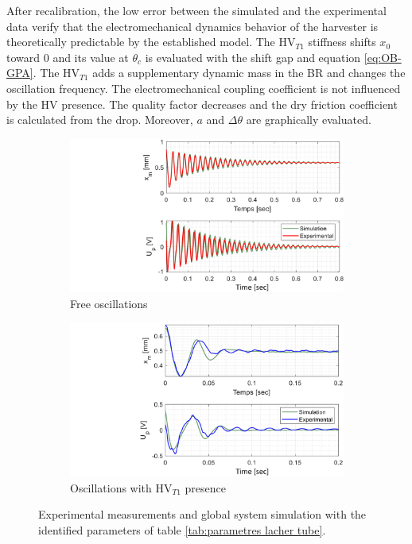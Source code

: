 \documentclass[3p,twocolumn,preprint]{elsarticle}
\begin{document}
After recalibration, the low error between the simulated and the experimental data verify that the electromechanical dynamics behavior of the harvester is theoretically predictable by the established model. The HV$_{T1}$ stiffness shifts $x_0$ toward $0$ and its value at $\theta_c$ is evaluated with the shift gap and equation \ref{eq:OB-GPA}. The HV$_{T1}$ adds a supplementary dynamic mass in the BR and changes the oscillation frequency. The electromechanical coupling coefficient is not influenced by the HV presence. The quality factor decreases and the dry friction coefficient is calculated from the drop. Moreover, $a$ and $\Delta\theta$ are graphically evaluated.
\begin{figure}[!htbp]	
\captionsetup{justification=centering}
	\begin{subfigure}{.49\linewidth}
		\includegraphics[trim={9cm 0cm 0cm 0cm},clip,width=\linewidth]{figures/recalage_free.pdf}
		\caption{Free oscillations}
		\label{fig:recalage_free}
	\end{subfigure}
	\begin{subfigure}{.49\linewidth}
		\includegraphics[trim={8.6cm 0cm 0cm 0cm},clip,width=\linewidth]{figures/recalage_tube.pdf}
		\caption{Oscillations with HV$_{T1}$ presence}
		\label{fig:recalage_tube}
	\end{subfigure}
	\caption{Experimental measurements and global system simulation with the identified parameters of table \ref{tab:parametres lacher tube}.}
	\label{fig:recalage_global}
\end{figure}
\end{document}
